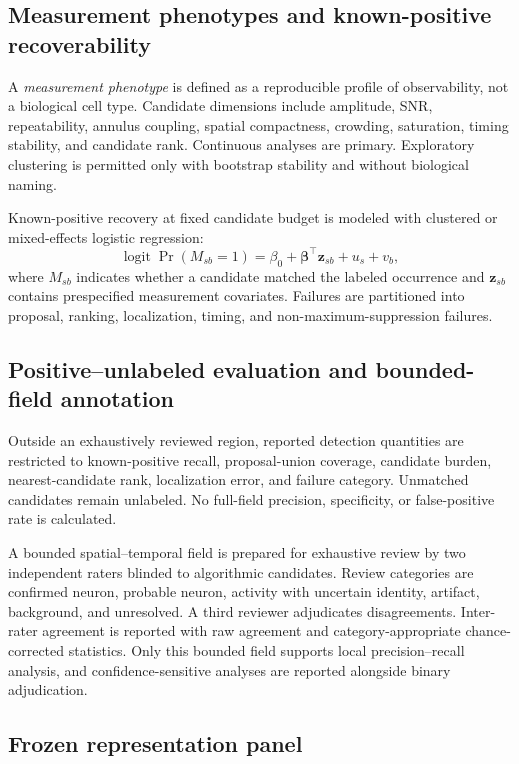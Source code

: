 \subsection{Measurement phenotypes and known-positive recoverability}

A \emph{measurement phenotype} is defined as a reproducible profile of observability, not a biological cell type. Candidate dimensions include amplitude, SNR, repeatability, annulus coupling, spatial compactness, crowding, saturation, timing stability, and candidate rank. Continuous analyses are primary. Exploratory clustering is permitted only with bootstrap stability and without biological naming.

Known-positive recovery at fixed candidate budget is modeled with clustered or mixed-effects logistic regression:
\begin{equation}
  \operatorname{logit}\Pr(M_{sb}=1)=\beta_0+\bm\beta^\top\bm z_{sb}+u_s+v_b,
\end{equation}
where $M_{sb}$ indicates whether a candidate matched the labeled occurrence and $\bm z_{sb}$ contains prespecified measurement covariates. Failures are partitioned into proposal, ranking, localization, timing, and non-maximum-suppression failures.

\subsection{Positive--unlabeled evaluation and bounded-field annotation}
\label{sec:pu-methods}

Outside an exhaustively reviewed region, reported detection quantities are restricted to known-positive recall, proposal-union coverage, candidate burden, nearest-candidate rank, localization error, and failure category. Unmatched candidates remain unlabeled. No full-field precision, specificity, or false-positive rate is calculated.

A bounded spatial--temporal field is prepared for exhaustive review by two independent raters blinded to algorithmic candidates. Review categories are confirmed neuron, probable neuron, activity with uncertain identity, artifact, background, and unresolved. A third reviewer adjudicates disagreements. Inter-rater agreement is reported with raw agreement and category-appropriate chance-corrected statistics. Only this bounded field supports local precision--recall analysis, and confidence-sensitive analyses are reported alongside binary adjudication.

\subsection{Frozen representation panel}


